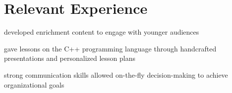 \section{Relevant Experience}

\vspace{\topsep} 
\begin{tightemize}
    \item developed enrichment content to engage with younger audiences 
    \item gave lessons on the C++ programming language through handcrafted presentations and personalized lesson plans
    \item strong communication skills allowed on-the-fly decision-making to achieve organizational goals
\end{tightemize}
